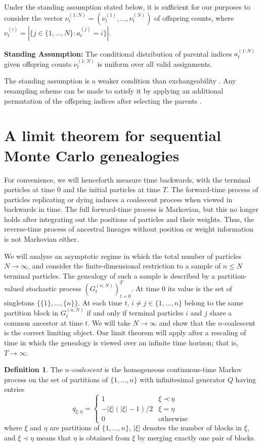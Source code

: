 \documentclass{article}
\theoremstyle{definition}
\newtheorem{definition}{Definition}
\newcommand{\1}[1]{\mathbbm{1}_{\{#1\}}}
\begin{document}
Under the standing assumption stated below, it is sufficient for our purposes to consider the vector $\nu_t^{(1:N)} = (\nu_t^{(1)},\dots,\nu_t^{(N)})$ of offspring counts, where $\nu_t^{(i)} = |\{ j\in \{1,\dots,N\} : a_t^{(j)} =i \}|$.

\textbf{Standing Assumption:} The conditional distribution of parental indices $a_t^{(1:N)}$ given offspring counts $\nu_t^{(1:N)}$ is uniform over all valid assignments.

The standing assumption is a weaker condition than exchangeability \citep[p446]{mohle1998}.
Any resampling scheme can be made to satisfy it by applying an additional permutation of the offspring indices after selecting the parents \citep[see][p. 290]{andrieu2010}.

\section{A limit theorem for sequential Monte Carlo genealogies}
For convenience, we will henceforth measure time backwards, with the terminal particles at time 0 and the initial particles at time $T$. The forward-time process of particles replicating or dying induces a coalescent process when viewed in backwards in time.
The full forward-time process is Markovian, but this no longer holds after integrating out the positions of particles and their weights.
Thus, the reverse-time process of ancestral lineages without position or weight information is not Markovian either.

We will analyse an asymptotic regime in which the total number of particles $N\to\infty$, and consider the finite-dimensional restriction to a sample of $n\leq N$ terminal particles.
The genealogy of such a sample is described by a partition-valued stochastic process $(G_t^{(n,N)})_{t=0}^T$. At time 0 its value is the set of singletons $\{\{1\},\dots,\{n\}\}$. At each time $t$, $i\neq j \in \{1,\dots, n\}$ belong to the same partition block  in $G_t^{(n,N)}$ if and only if terminal particles $i$ and $j$ share a common ancestor at time $t$. We will take $N\to\infty$ and show that the $n$-coalescent \citep{kingman1982coal} is the correct limiting object.
Our limit theorem will apply after a rescaling of time in which the genealogy is viewed over an infinite time horizon; that is, $T\to\infty$.

\begin{definition}
\label{def:kingman}
The \emph{$n$-coalescent} is the homogeneous continuous-time Markov process on the set of partitions of $\{1,\dots,n\}$ with infinitesimal generator $Q$ having entries
\begin{equation*}
q_{\xi,\eta} = \begin{cases}
1 & \xi \prec \eta\\
-|\xi|(|\xi|-1)/2 & \xi=\eta \\
0 & \text{otherwise}
\end{cases}
\end{equation*}
where $\xi$ and $\eta$ are partitions of $\{1,...,n\}$, $|\xi|$ denotes the number of blocks in $\xi$, and $\xi \prec \eta$ means that $\eta$ is obtained from $\xi$ by merging exactly one pair of blocks.
\end{definition}
\end{document}
